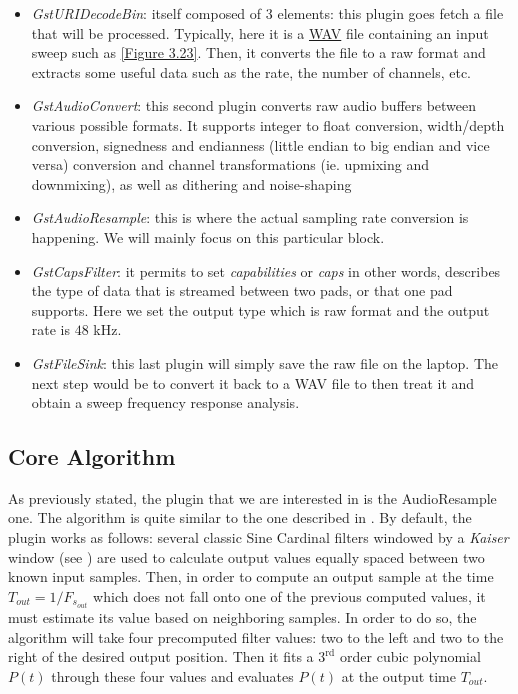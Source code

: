 

\begin{itemize}
	\item \textit{GstURIDecodeBin}: itself composed of 3 elements: this plugin goes fetch a file that will be processed. Typically, here it is a \hyperlink{WAV}{WAV} file containing an input sweep such as \ref{Figure 3.23}. Then, it converts the file to a raw format and extracts some useful data such as the rate, the number of channels, etc. 
	\item \textit{GstAudioConvert}: this second plugin converts raw audio buffers between various possible formats. It supports integer to float conversion, width/depth conversion, signedness and endianness (little endian to big endian and vice versa) conversion and channel transformations (ie. upmixing and downmixing), as well as dithering and noise-shaping
	\item \textit{GstAudioResample}: this is where the actual sampling rate conversion is happening. We will mainly focus on this particular block.
	\item \textit{GstCapsFilter}: it permits to set \textit{capabilities} or \textit{caps} in other words, describes the type of data that is streamed between two pads, or that one pad supports. Here we set the output type which is raw format and the output rate is $48$ kHz. 
	\item \textit{GstFileSink}: this last plugin will simply save the raw file on the laptop. The next step would be to convert it back to a WAV file to then treat it and obtain a sweep frequency response analysis.
\end{itemize}

\subsection{Core Algorithm}

As previously stated, the plugin that we are interested in is the AudioResample one. The algorithm is quite similar to the one described in \cite{async1}. By default, the plugin works as follows: several classic Sine Cardinal filters windowed by a \textit{Kaiser} window (see \cite{async2}) are used to calculate output values equally spaced between two known input samples. Then, in order to compute an output sample at the time $T_{out} = 1/F_{s_{out}}$ which does not fall onto one of the previous computed values, it must estimate its value based on neighboring samples. In order to do so, the algorithm will take four precomputed filter values: two to the left and two to the right of the desired output position.  Then it fits a $3^{\text{rd}}$ order cubic polynomial $P(t)$ through these four values and evaluates $P(t)$ at the output time $T_{out}$.

